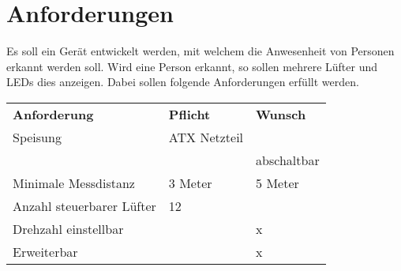 



\section{Anforderungen}
Es soll ein Gerät entwickelt werden, mit welchem die Anwesenheit von Personen 
erkannt werden soll. Wird eine Person erkannt, so sollen mehrere Lüfter und 
LEDs dies anzeigen. Dabei sollen folgende Anforderungen erfüllt werden. 

\begin{table}[h!]
  \begin{tabular}{@{}p{}p{}p{}}
    \rowcolor{white} \textbf{Anforderung}     & \textbf{Pflicht} & \textbf{Wunsch}\\
    \rowcolor{lgray} Speisung                 & ATX Netzteil     &                \\
    \rowcolor{lgray}                          &                  & abschaltbar    \\
    \rowcolor{white} Minimale Messdistanz     & 3 Meter          & 5 Meter        \\
    \rowcolor{lgray} Anzahl steuerbarer Lüfter& 12               &                \\
    \rowcolor{white} Drehzahl einstellbar     &                  & x              \\
    \rowcolor{lgray} Erweiterbar              &                  & x              \\
  \end{tabular}
  \label{tab:anforderungen}
\end{table}
